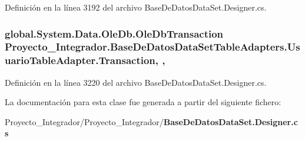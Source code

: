 Definición en la línea 3192 del archivo Base\-De\-Datos\-Data\-Set.\-Designer.\-cs.

\subsubsection[{Transaction}]{\setlength{\rightskip}{0pt plus 5cm}global.\-System.\-Data.\-Ole\-Db.\-Ole\-Db\-Transaction Proyecto\-\_\-\-Integrador.\-Base\-De\-Datos\-Data\-Set\-Table\-Adapters.\-Usuario\-Table\-Adapter.\-Transaction\hspace{0.3cm}{\ttfamily [get]}, {\ttfamily [set]}, {\ttfamily [package]}}\label{class_proyecto___integrador_1_1_base_de_datos_data_set_table_adapters_1_1_usuario_table_adapter_aee305d94dfc85df4fe14e9a62dc633f1}


Definición en la línea 3220 del archivo Base\-De\-Datos\-Data\-Set.\-Designer.\-cs.



La documentación para esta clase fue generada a partir del siguiente fichero\-:\begin{DoxyCompactItemize}
\item 
Proyecto\-\_\-\-Integrador/\-Proyecto\-\_\-\-Integrador/{\bf Base\-De\-Datos\-Data\-Set.\-Designer.\-cs}\end{DoxyCompactItemize}
